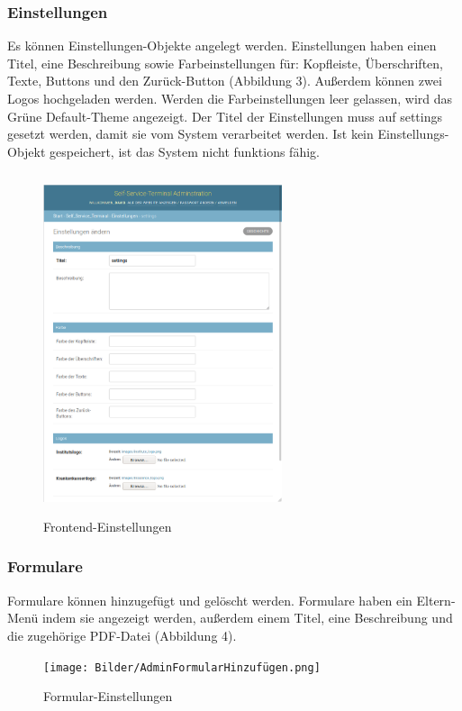 \newpage

\subsubsection{Einstellungen} Es können Einstellungen-Objekte angelegt werden. Einstellungen haben einen Titel, eine Beschreibung sowie Farbeinstellungen für: Kopfleiste, Überschriften, Texte, Buttons und den Zurück-Button (Abbildung 3). Außerdem können zwei Logos hochgeladen werden. Werden die Farbeinstellungen leer gelassen, wird das Grüne Default-Theme angezeigt. Der Titel der Einstellungen muss auf \glqq settings\grqq{} gesetzt werden, damit sie vom System verarbeitet werden. Ist kein Einstellungs-Objekt gespeichert, ist das System nicht funktions fähig.

\begin{figure}[htp]
    \centering
    \includegraphics[width=7cm , height=10cm]{Bilder/AdminEinstellungen.png}
    \caption[Startseite des Self-Service-Terminals]{Frontend-Einstellungen}
    \label{fig:SSTAdminFrontend}
\end{figure}

\newpage

\subsubsection{Formulare} Formulare können hinzugefügt und gelöscht werden. Formulare haben ein Eltern-Menü indem sie angezeigt werden, außerdem einem Titel, eine Beschreibung und die zugehörige PDF-Datei (Abbildung 4).

\begin{figure}[htp]
    \centering
    \texttt{[image: Bilder/AdminFormularHinzufügen.png]}
    \caption[Startseite des Self-Service-Terminals]{Formular-Einstellungen}
    \label{fig:SSTAdminFormular}
\end{figure}

